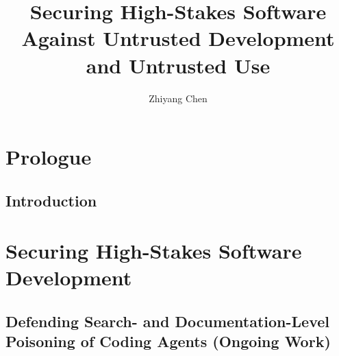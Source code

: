 \documentclass{ut-thesis}
\author{Zhiyang Chen}
\title{Securing High-Stakes Software Against Untrusted Development and Untrusted Use}
\begin{document}
  \frontmatter
    \maketitle


    

    
    \tableofcontents

  \mainmatter

    \part{Prologue}


    \chapter{Introduction}
    \label{chapter:intro}

    


    

    

    

    



    \part{Securing High-Stakes Software Development}
    \label{part:development}

    \chapter{Defending Search- and Documentation-Level Poisoning of Coding Agents (Ongoing Work)}
\end{document}
